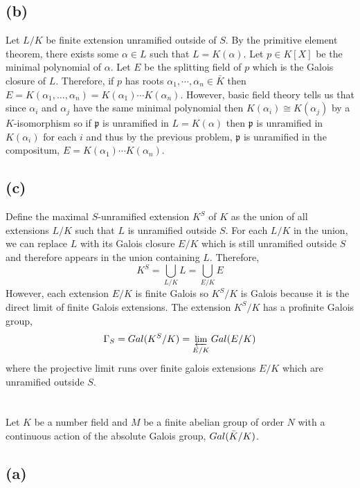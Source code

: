 \documentclass[12pt]{extarticle}
\begin{document}
\subsection*{(b)}

Let $L/K$ be finite extension unramified outside of $S$. By the primitive element theorem, there exists some $\alpha \in L$ such that $L = K(\alpha)$. Let $p \in K[X]$ be the minimal polynomial of $\alpha$. Let $E$ be the splitting field of $p$ which is the Galois closure of $L$. Therefore, if $p$ has roots $\alpha_1, \cdots, \alpha_n \in \bar{K}$ then $E = K(\alpha_1, \dots, \alpha_n) = K(\alpha_1) \cdots K(\alpha_n)$. However, basic field theory tells us that since $\alpha_i$ and $\alpha_j$ have the same minimal polynomial then $K(\alpha_i) \cong K(\alpha_j)$ by a $K$-isomorphism so if $\mathfrak{p}$ is unramified in $L = K(\alpha)$ then $\mathfrak{p}$ is unramified in $K(\alpha_i)$ for each $i$ and thus by the previous problem, $\mathfrak{p}$ is unramified in the compositum, $E = K(\alpha_1) \cdots K(\alpha_n)$.  

\subsection*{(c)}

Define the maximal $S$-unramified extension $K^S$ of $K$ as the union of all extensions $L/K$ such that $L$ is unramified outside $S$. For each $L/K$ in the union, we can replace $L$ with its Galois closure $E/K$ which is still unramified outside $S$ and therefore appears in the union containing $L$. Therefore,
\[ K^S = \bigcup_{L/K} L = \bigcup_{E/K} E \]
However, each extension $E/K$ is finite Galois so $K^S/K$ is Galois because it is the direct limit of finite Galois extensions. The extension $K^S / K$ has a profinite Galois group,
\[ \Gamma_S = Gal \small(K^S / K  \small) = \varprojlim_{E/K} Gal \small(E/K \small) \]
where the projective limit runs over finite galois extensions $E/K$ which are unramified outside $S$.

\section{}

Let $K$ be a number field and $M$ be a finite abelian group of order $N$ with a continuous action of the absolute Galois group, $Gal \small(\bar{K}/K \small)$.

\subsection*{(a)}
\end{document}
